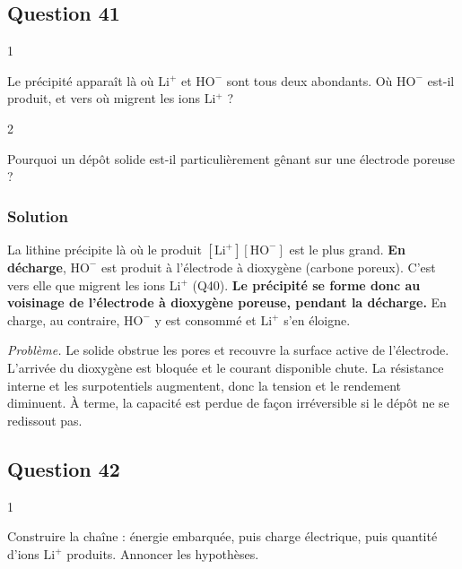 \documentclass[11pt,a4paper]{article}
\begin{document}
\hypertarget{question-41}{%
\subsection{Question 41}\label{question-41}}

\begin{indication}{1}

Le précipité apparaît là où \(\mathrm{Li^+}\) et \(\mathrm{HO^-}\) sont tous deux abondants. Où \(\mathrm{HO^-}\) est-il produit, et vers où migrent les ions \(\mathrm{Li^+}\) ?

\end{indication}

\begin{indication}{2}

Pourquoi un dépôt solide est-il particulièrement gênant sur une électrode poreuse ?

\end{indication}

\hypertarget{solution-40}{%
\subsubsection{Solution}\label{solution-40}}

La lithine précipite là où le produit \([\mathrm{Li^+}][\mathrm{HO^-}]\) est le plus grand. \textbf{En décharge}, \(\mathrm{HO^-}\) est produit à l'électrode à dioxygène (carbone poreux). C'est vers elle que migrent les ions \(\mathrm{Li^+}\) (Q40). \textbf{Le précipité se forme donc au voisinage de l'électrode à dioxygène poreuse, pendant la décharge.} En charge, au contraire, \(\mathrm{HO^-}\) y est consommé et \(\mathrm{Li^+}\) s'en éloigne.

\emph{Problème.} Le solide obstrue les pores et recouvre la surface active de l'électrode. L'arrivée du dioxygène est bloquée et le courant disponible chute. La résistance interne et les surpotentiels augmentent, donc la tension et le rendement diminuent. À terme, la capacité est perdue de façon irréversible si le dépôt ne se redissout pas.

\hypertarget{question-42}{%
\subsection{Question 42}\label{question-42}}

\begin{indication}{1}

Construire la chaîne : énergie embarquée, puis charge électrique, puis quantité d'ions \(\mathrm{Li^+}\) produits. Annoncer les hypothèses.

\end{indication}
\end{document}
